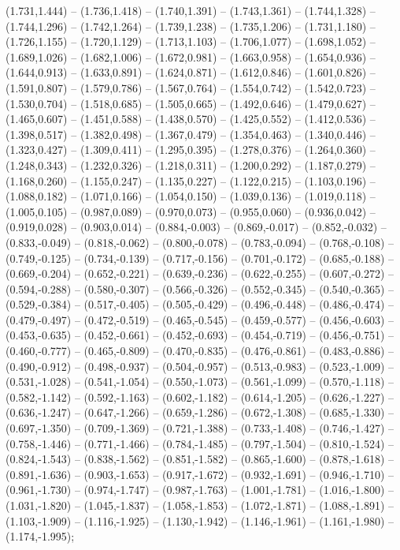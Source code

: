 (1.731,1.444) -- (1.736,1.418) -- (1.740,1.391) -- (1.743,1.361) -- (1.744,1.328) -- (1.744,1.296) -- (1.742,1.264) -- (1.739,1.238) -- (1.735,1.206) -- (1.731,1.180) -- (1.726,1.155) -- (1.720,1.129) -- (1.713,1.103) -- (1.706,1.077) -- (1.698,1.052) -- (1.689,1.026) -- (1.682,1.006) -- (1.672,0.981) -- (1.663,0.958) -- (1.654,0.936) -- (1.644,0.913) -- (1.633,0.891) -- (1.624,0.871) -- (1.612,0.846) -- (1.601,0.826) -- (1.591,0.807) -- (1.579,0.786) -- (1.567,0.764) -- (1.554,0.742) -- (1.542,0.723) -- (1.530,0.704) -- (1.518,0.685) -- (1.505,0.665) -- (1.492,0.646) -- (1.479,0.627) -- (1.465,0.607) -- (1.451,0.588) -- (1.438,0.570) -- (1.425,0.552) -- (1.412,0.536) -- (1.398,0.517) -- (1.382,0.498) -- (1.367,0.479) -- (1.354,0.463) -- (1.340,0.446) -- (1.323,0.427) -- (1.309,0.411) -- (1.295,0.395) -- (1.278,0.376) -- (1.264,0.360) -- (1.248,0.343) -- (1.232,0.326) -- (1.218,0.311) -- (1.200,0.292) -- (1.187,0.279) -- (1.168,0.260) -- (1.155,0.247) -- (1.135,0.227) -- (1.122,0.215) -- (1.103,0.196) -- (1.088,0.182) -- (1.071,0.166) -- (1.054,0.150) -- (1.039,0.136) -- (1.019,0.118) -- (1.005,0.105) -- (0.987,0.089) -- (0.970,0.073) -- (0.955,0.060) -- (0.936,0.042) -- (0.919,0.028) -- (0.903,0.014) -- (0.884,-0.003) -- (0.869,-0.017) -- (0.852,-0.032) -- (0.833,-0.049) -- (0.818,-0.062) -- (0.800,-0.078) -- (0.783,-0.094) -- (0.768,-0.108) -- (0.749,-0.125) -- (0.734,-0.139) -- (0.717,-0.156) -- (0.701,-0.172) -- (0.685,-0.188) -- (0.669,-0.204) -- (0.652,-0.221) -- (0.639,-0.236) -- (0.622,-0.255) -- (0.607,-0.272) -- (0.594,-0.288) -- (0.580,-0.307) -- (0.566,-0.326) -- (0.552,-0.345) -- (0.540,-0.365) -- (0.529,-0.384) -- (0.517,-0.405) -- (0.505,-0.429) -- (0.496,-0.448) -- (0.486,-0.474) -- (0.479,-0.497) -- (0.472,-0.519) -- (0.465,-0.545) -- (0.459,-0.577) -- (0.456,-0.603) -- (0.453,-0.635) -- (0.452,-0.661) -- (0.452,-0.693) -- (0.454,-0.719) -- (0.456,-0.751) -- (0.460,-0.777) -- (0.465,-0.809) -- (0.470,-0.835) -- (0.476,-0.861) -- (0.483,-0.886) -- (0.490,-0.912) -- (0.498,-0.937) -- (0.504,-0.957) -- (0.513,-0.983) -- (0.523,-1.009) -- (0.531,-1.028) -- (0.541,-1.054) -- (0.550,-1.073) -- (0.561,-1.099) -- (0.570,-1.118) -- (0.582,-1.142) -- (0.592,-1.163) -- (0.602,-1.182) -- (0.614,-1.205) -- (0.626,-1.227) -- (0.636,-1.247) -- (0.647,-1.266) -- (0.659,-1.286) -- (0.672,-1.308) -- (0.685,-1.330) -- (0.697,-1.350) -- (0.709,-1.369) -- (0.721,-1.388) -- (0.733,-1.408) -- (0.746,-1.427) -- (0.758,-1.446) -- (0.771,-1.466) -- (0.784,-1.485) -- (0.797,-1.504) -- (0.810,-1.524) -- (0.824,-1.543) -- (0.838,-1.562) -- (0.851,-1.582) -- (0.865,-1.600) -- (0.878,-1.618) -- (0.891,-1.636) -- (0.903,-1.653) -- (0.917,-1.672) -- (0.932,-1.691) -- (0.946,-1.710) -- (0.961,-1.730) -- (0.974,-1.747) -- (0.987,-1.763) -- (1.001,-1.781) -- (1.016,-1.800) -- (1.031,-1.820) -- (1.045,-1.837) -- (1.058,-1.853) -- (1.072,-1.871) -- (1.088,-1.891) -- (1.103,-1.909) -- (1.116,-1.925) -- (1.130,-1.942) -- (1.146,-1.961) -- (1.161,-1.980) -- (1.174,-1.995);
